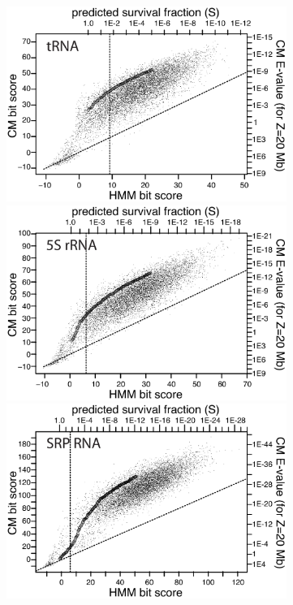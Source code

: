 \documentclass[11pt]{article}
\begin{document}
\begin{figure}[h]
\begin{center}
\includegraphics[height=2.5in]{figs/tRNA_fst}
\includegraphics[height=2.5in]{figs/5S_fst}
\includegraphics[height=2.5in]{figs/SRP_fst}

\label{Fig:fst}
\end{center}
\end{figure}

\newpage
\end{document}
